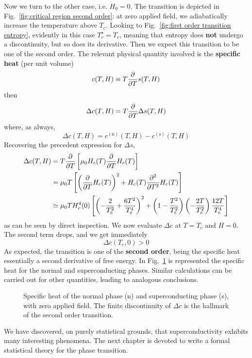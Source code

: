 Now we turn to the other case, i.e. $H_0 = 0$. The transition is depicted in Fig.~\ref{fig:critical region second order}: at zero applied field, we adiabatically increase the temperature above $T_c$. Looking to Fig.~\ref{fig:first order transition entropy}, evidently in this case $T_c^\star = T_c$, meaning that entropy does \textbf{not} undergo a discontinuity, but so does its derivative. Then we expect this transition to be one of the second order. The relevant physical quantity involved is the \textbf{specific heat} (per unit volume)
\[
    c(T,H) \equiv T \pdv{}{T} s(T,H)
\]
then
\[    
    \Delta c(T,H) = T \pdv{}{T} \Delta s(T,H)
\]
where, as always,
\[
    \Delta c(T,H) = c^{(\mathrm{n})}(T,H) - c^{(\mathrm{s})}(T,H) 
\]
Recovering the precedent expression for $\Delta s$,
\[
\begin{aligned}
     \Delta c(T,H) &= T \pdv{}{T} \left[{ \mu_0 H_c(T) \pdv{}{T} H_c(T) }\right] \\
                 &= \mu_0 T \left[{ \left({ \pdv{}{T} H_c(T) }\right)^2 + H_c (T) \pdv[2]{}{T} H_c(T) }\right] \\
                 &\simeq \mu_0 T H_c^4(0) \left[{ \left({ - \frac{2}{T_c^2} + \frac{6 T^2}{T_c^4} }\right)^2 + \left({1 - \frac{T^2}{T_c^2}}\right) \left({ - \frac{2T}{T_c^2} }\right) \frac{12T}{T_c^4} }\right]
\end{aligned}
\]
as can be seen by direct inspection. We now evaluate $\Delta c$ at $T = T_c$ and $H = 0$. The second term drops, and we get immediately
\[
    \Delta c(T_c,0) > 0
\]
As expected, the transition is one of the \textbf{second order}, being the specific heat essentially a second derivative of free energy. In Fig.~\ref{fig:second order transition specific heat} is represented the specific heat for the normal and superconducting phases. Similar calculations can be carried out for other quantities, leading to analogous conclusions.

\begin{figure}
    \centering
    
    \caption{Specific heat of the normal phase (n) and superconducting phase (s), with zero applied field. The finite discontinuity of $\Delta c$ is the hallmark of the second order transition.}
    \label{fig:second order transition specific heat}
\end{figure}

We have discovered, on purely statistical grounds, that superconductivity exhibits many interesting phenomena. The next chapter is devoted to write a formal statistical theory for the phase transition.